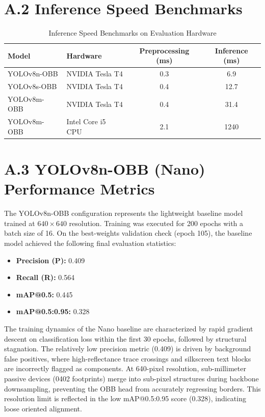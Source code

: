 \documentclass[12pt,a4paper]{report}
\begin{document}
\section*{A.2 Inference Speed Benchmarks}

\begin{table}[H]
  \centering
  \caption{Inference Speed Benchmarks on Evaluation Hardware}
  \label{tab:speed_bench}
  \begin{tabular}{@{}llcc@{}}
    \toprule
    \textbf{Model} & \textbf{Hardware} & \textbf{Preprocessing (ms)} & \textbf{Inference (ms)} \\
    \midrule
    YOLOv8n-OBB & NVIDIA Tesla T4  &  0.3 &  6.9 \\
    YOLOv8s-OBB & NVIDIA Tesla T4  &  0.4 & 12.7 \\
    YOLOv8m-OBB & NVIDIA Tesla T4  &  0.4 & 31.4 \\
    YOLOv8m-OBB & Intel Core i5 CPU & 2.1 & 1240 \\
    \bottomrule
  \end{tabular}
\end{table}

\section*{A.3 YOLOv8n-OBB (Nano) Performance Metrics}
The YOLOv8n-OBB configuration represents the lightweight baseline model trained at $640 \times 640$ resolution. Training was executed for 200 epochs with a batch size of 16. On the best-weights validation check (epoch 105), the baseline model achieved the following final evaluation statistics:
\begin{itemize}
  \item \textbf{Precision (P):} 0.409
  \item \textbf{Recall (R):} 0.564
  \item \textbf{mAP@0.5:} 0.445
  \item \textbf{mAP@0.5:0.95:} 0.328
\end{itemize}

The training dynamics of the Nano baseline are characterized by rapid gradient descent on classification loss within the first 30 epochs, followed by structural stagnation. The relatively low precision metric (0.409) is driven by background false positives, where high-reflectance trace crossings and silkscreen text blocks are incorrectly flagged as components. At 640-pixel resolution, sub-millimeter passive devices (0402 footprints) merge into sub-pixel structures during backbone downsampling, preventing the OBB head from accurately regressing borders. This resolution limit is reflected in the low mAP@0.5:0.95 score (0.328), indicating loose oriented alignment.
\end{document}
